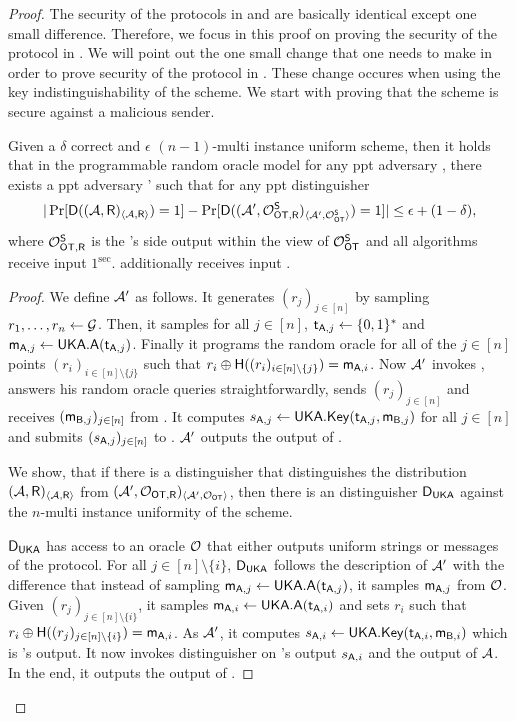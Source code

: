 \begin{proof}
The security of the protocols in  and  are basically identical except one small difference. Therefore, we focus in this proof on proving the security of the protocol in . We will point out the one small change that one needs to make in order to prove security of the protocol in . These change occures when using the key indistinguishability of the \UKA scheme. 
We start with proving that the scheme is secure against a malicious sender. 
\begin{claim}\label{claim:malsender}
Given a $\delta$ correct and $\epsilon$ $(n-1)$-multi instance uniform \UKA scheme, then it holds that in the programmable random oracle model for any ppt adversary \Adv, there exists a ppt adversary \Adv' such that for any ppt distinguisher \D
$$
|\Pr[\mathsf D((\mathcal{A},\mathsf{R})_{\langle \mathcal{A}, \mathsf{R}\rangle})=1] -\Pr[\mathsf D( (\mathcal{A}', \mathcal{O}_{\mathsf{OT}, \mathsf{R}}^\mathsf{S})_{\langle \mathcal{A}', \mathcal{O}_{\mathsf{OT}}^\mathsf{S}\rangle})=1]|\leq \epsilon+(1-\delta),
$$
where $\mathcal{O}_{\mathsf{OT}, \mathsf{R}}^\mathsf{S}$ is the \rec's side output within the view of $\mathcal{O}_{\mathsf{OT}}^\mathsf{S}$ and all algorithms receive input $1^\sec$. \rec additionally receives input \set.
\end{claim}

\begin{proof}
We define $\mathcal{A}'$ as follows. 
It generates $(r_j)_{j\in[n]}$ by sampling $r_1,\dots, r_n\leftarrow \mathcal{G}$. Then, it samples for all $j\in[n]$, $\mathsf{t}_{\mathsf{A},j}\leftarrow\{0,1\}^*$ and $\mathsf{m}_{\mathsf{A},j}\leftarrow\mathsf{UKA}.\mathsf{A}(\mathsf{t}_{\mathsf{A},j})$. Finally it programs the random oracle for all of the $j\in[n]$ points $(r_i)_{i\in[n]\setminus \{j\}}$ such that $r_i\oplus\mathsf{H}((r_i)_{i\in[n]\setminus \{j\}})=\mathsf{m}_{\mathsf{A},i}$. Now $\mathcal{A}'$ invokes \Adv, answers his random oracle queries straightforwardly, sends $(r_j)_{j\in[n]}$ and receives $(\mathsf{m}_{\mathsf{B},j})_{j\in[n]}$ from \Adv. It computes $s_{\mathsf{A},j}\leftarrow\mathsf{UKA}.\mathsf{Key}(\mathsf{t}_{\mathsf{A},j},\mathsf{m}_{\mathsf{B},j})$ for all $j\in[n]$ and submits $(s_{\mathsf{A},j})_{j\in [n]}$ to \OOT. $\mathcal{A}'$ outputs the output of \Adv.

We show, that if there is a distinguisher \D that distinguishes the distribution $(\mathcal{A},\mathsf{R})_{\langle \mathcal{A}, \mathsf{R}\rangle}$ from $(\mathcal{A}',\mathcal{O}_{\mathsf{OT}, \mathsf{R}})_{\langle \mathcal{A}', \mathcal{O}_{\mathsf{OT}}\rangle}$, then there is an distinguisher $\mathsf D_{\mathsf{UKA}}$ against the $n$-multi instance uniformity of the \UKA scheme. 

$\mathsf D_{\mathsf{UKA}}$ has access to an oracle $\mathcal{O}$ that either outputs uniform strings or messages of the \UKA protocol. For all $j\in[n]\setminus\{i\}$, $\mathsf D_{\mathsf{UKA}}$ follows the description of $\mathcal{A}'$ with the difference that instead of sampling  $\mathsf{m}_{\mathsf{A},j}\leftarrow\mathsf{UKA}.\mathsf{A}(\mathsf{t}_{\mathsf{A},j})$, it samples $\mathsf{m}_{\mathsf{A},j}$ from $\mathcal{O}$. Given $(r_j)_{j\in[n]\setminus\{i\}}$, it samples $\mathsf{m}_{\mathsf{A},i}\leftarrow\mathsf{UKA}.\mathsf{A}(\mathsf{t}_{\mathsf{A},i})$ and sets $r_i$ such that $r_i\oplus\mathsf{H}((r_j)_{j\in[n]\setminus \{i\}})=\mathsf{m}_{\mathsf{A},i}$. As $\mathcal{A}'$, it computes $s_{\mathsf{A},i}\leftarrow\mathsf{UKA}.\mathsf{Key}(\mathsf{t}_{\mathsf{A},i},\mathsf{m}_{\mathsf{B},i})$ which is \rec's output. It now invokes distinguisher \D on \rec's output $s_{\mathsf{A},i}$ and the output of $\mathcal{A}$. In the end, it outputs the output of \D.



\end{proof}
\end{proof}
